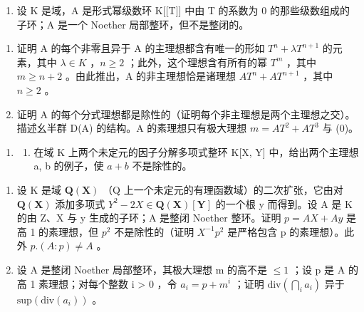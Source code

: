 
\begin{enumerate}
\def\labelenumi{\arabic{enumi}.}
\tightlist
\item
  设 K 是域，A 是形式幂级数环 K{[}{[}T{]}{]} 中由 T 的系数为 0 的那些级数组成的子环；A 是一个 Noether 局部整环，但不是整闭的。
\end{enumerate}

\begin{enumerate}
\def\labelenumi{(\alph{enumi})}
\item
  证明 A 的每个非零且异于 A 的主理想都含有唯一的形如 \(T^{n} + \lambda T^{n+1}\) 的元素，其中 \(\lambda \in K\) ，\(n \geqslant 2\) ；此外，这个理想含有所有的幂 \(T^{m}\) ，其中 \(m \geqslant n + 2\) 。由此推出，A 的非主理想恰是诸理想 \(AT^{n} + AT^{n+1}\) ，其中 \(n \geqslant 2\) 。
\item
  证明 A 的每个分式理想都是除性的（证明每个非主理想是两个主理想之交）。描述幺半群 D(A) 的结构。A 的素理想只有极大理想 \(m = AT^{2} + AT^{3}\) 与 (0)。
\end{enumerate}

\begin{enumerate}
\def\labelenumi{\arabic{enumi}.}
\setcounter{enumi}{1}
\tightlist
\item
  \begin{enumerate}
  \def\labelenumii{(\alph{enumii})}
  \tightlist
  \item
    在域 K 上两个未定元的因子分解多项式整环 K{[}X, Y{]} 中，给出两个主理想 a, b 的例子，使 \(a + b\) 不是除性的。
  \end{enumerate}
\end{enumerate}

\begin{enumerate}
\def\labelenumi{(\alph{enumi})}
\setcounter{enumi}{1}
\item
  设 K 是域 \(\mathbf{Q}(\mathbf{X})\) （Q 上一个未定元的有理函数域）的二次扩张，它由对 \(\mathbf{Q}(\mathbf{X})\) 添加多项式 \(Y^{2}-2X\in\mathbf{Q}(\mathbf{X})[\mathbf{Y}]\) 的一个根 y 而得到。设 A 是 K 的由 Z、X 与 y 生成的子环；A 是整闭 Noether 整环。证明 \(p=AX+Ay\) 是高 1 的素理想，但 \(p^{2}\) 不是除性的（证明 \(X^{-1}p^{2}\) 是严格包含 p 的素理想）。此外 \(p.(A:p)\neq A\) 。
\item
  设 A 是整闭 Noether 局部整环，其极大理想 m 的高不是 \(\leqslant1\) ；设 p 是 A 的高 1 素理想；对每个整数 i \textgreater{} 0 ，令 \(a_{i} = p + m^{i}\) ；证明 \(\text{div}\left(\bigcap_{i} a_{i}\right)\) 异于 \(\text{sup}(\text{div}(a_{i}))\) 。
\end{enumerate}

